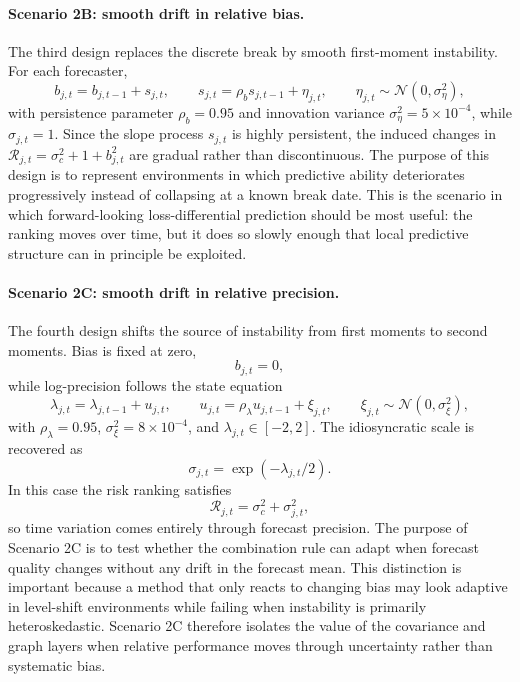 \documentclass[11pt,a4paper]{article}
\begin{document}
\paragraph{Scenario 2B: smooth drift in relative bias.}
The third design replaces the discrete break by smooth first-moment instability. For each forecaster,
\begin{equation}
b_{j,t}=b_{j,t-1}+s_{j,t},
\qquad
s_{j,t}= \rho_b s_{j,t-1}+\eta_{j,t},
\qquad
\eta_{j,t}\sim \mathcal{N}(0,\sigma_{\eta}^2),
\end{equation}
with persistence parameter $\rho_b=0.95$ and innovation variance $\sigma_{\eta}^2=5\times 10^{-4}$, while $\sigma_{j,t}=1$. Since the slope process $s_{j,t}$ is highly persistent, the induced changes in $\mathcal{R}_{j,t}=\sigma_c^2+1+b_{j,t}^2$ are gradual rather than discontinuous. The purpose of this design is to represent environments in which predictive ability deteriorates progressively instead of collapsing at a known break date. This is the scenario in which forward-looking loss-differential prediction should be most useful: the ranking moves over time, but it does so slowly enough that local predictive structure can in principle be exploited.

\paragraph{Scenario 2C: smooth drift in relative precision.}
The fourth design shifts the source of instability from first moments to second moments. Bias is fixed at zero,
\begin{equation}
b_{j,t}=0,
\end{equation}
while log-precision follows the state equation
\begin{equation}
\lambda_{j,t}=\lambda_{j,t-1}+u_{j,t},
\qquad
u_{j,t}=\rho_{\lambda}u_{j,t-1}+\xi_{j,t},
\qquad
\xi_{j,t}\sim \mathcal{N}(0,\sigma_{\xi}^2),
\end{equation}
with $\rho_{\lambda}=0.95$, $\sigma_{\xi}^2=8\times10^{-4}$, and $\lambda_{j,t}\in[-2,2]$. The idiosyncratic scale is recovered as
\begin{equation}
\sigma_{j,t} = \exp(-\lambda_{j,t}/2).
\end{equation}
In this case the risk ranking satisfies
\begin{equation}
\mathcal{R}_{j,t}=\sigma_c^2+\sigma_{j,t}^2,
\end{equation}
so time variation comes entirely through forecast precision. The purpose of Scenario 2C is to test whether the combination rule can adapt when forecast quality changes without any drift in the forecast mean. This distinction is important because a method that only reacts to changing bias may look adaptive in level-shift environments while failing when instability is primarily heteroskedastic. Scenario 2C therefore isolates the value of the covariance and graph layers when relative performance moves through uncertainty rather than systematic bias.
\end{document}
